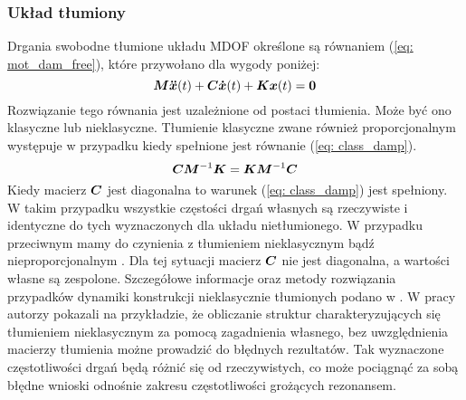 \subsubsection{Układ tłumiony}
Drgania swobodne tłumione układu MDOF określone są równaniem (\ref{eq: mot_dam_free}), które przywołano dla wygody poniżej:
\begin{equation} \label{eq: mot_dam_free2}
\bm{M} \bm{\ddot{x}}(t) +\bm{C} \bm{\dot{x}}(t)+ \bm{Kx}(t) = \bm{0}
\end{equation}
Rozwiązanie tego równania jest uzależnione od postaci tłumienia. Może być ono klasyczne lub nieklasyczne. Tłumienie klasyczne zwane również proporcjonalnym  występuje w przypadku kiedy spełnione jest równanie (\ref{eq: class_damp}). 
\begin{equation} \label{eq: class_damp}
\bm{CM}^{-1}\bm{K} = \bm{KM}^{-1}\bm{C}
\end{equation}
Kiedy macierz $\bm{C}$ jest diagonalna to warunek (\ref{eq: class_damp}) jest spełniony. W takim przypadku wszystkie częstości drgań własnych są rzeczywiste i identyczne do tych wyznaczonych dla układu nietłumionego. W przypadku przeciwnym mamy do czynienia z tłumieniem nieklasycznym bądź nieproporcjonalnym . Dla tej sytuacji macierz $\bm{C}$ nie jest diagonalna, a wartości własne są zespolone. Szczegółowe informacje oraz metody rozwiązania przypadków dynamiki konstrukcji nieklasycznie tłumionych podano w \parencite{Caughey1961,Chopra2012a}. W pracy \cite{Inman1995} autorzy pokazali na przykładzie, że obliczanie struktur charakteryzujących się tłumieniem nieklasycznym za pomocą zagadnienia własnego, bez uwzględnienia macierzy tłumienia możne prowadzić do błędnych rezultatów. Tak wyznaczone częstotliwości drgań będą różnić się od rzeczywistych, co może pociągnąć za sobą błędne wnioski odnośnie zakresu częstotliwości grożących rezonansem.
